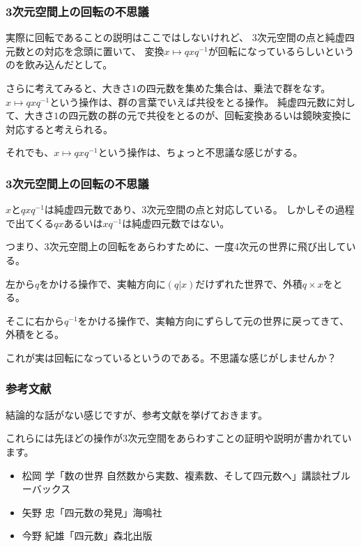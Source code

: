 \documentclass{beamer}
\begin{document}
\begin{frame}
    \frametitle{3次元空間上の回転の不思議}
    実際に回転であることの説明はここではしないけれど、
    3次元空間の点と純虚四元数との対応を念頭に置いて、
    変換\(x\mapsto qxq^{-1}\)が回転になっているらしいというのを飲み込んだとして。

    \bigskip
    さらに考えてみると、大きさ\(1\)の四元数を集めた集合は、乗法で群をなす。
    \(x\mapsto qxq^{-1}\)という操作は、群の言葉でいえば共役をとる操作。
    純虚四元数に対して、大きさ\(1\)の四元数の群の元で共役をとるのが、回転変換あるいは鏡映変換に対応すると考えられる。

    \bigskip
    それでも、\(x\mapsto qxq^{-1}\)という操作は、ちょっと不思議な感じがする。
\end{frame}

\begin{frame}
    \frametitle{3次元空間上の回転の不思議}
    \(x\)と\(qxq^{-1}\)は純虚四元数であり、3次元空間の点と対応している。
    しかしその過程で出てくる\(qx\)あるいは\(xq^{-1}\)は純虚四元数ではない。

    つまり、3次元空間上の回転をあらわすために、一度4次元の世界に飛び出している。

    \bigskip
    左から\(q\)をかける操作で、実軸方向に\((q|x)\)だけずれた世界で、外積\(q\times x\)をとる。

    そこに右から\(q^{-1}\)をかける操作で、実軸方向にずらして元の世界に戻ってきて、外積をとる。

    これが実は回転になっているというのである。不思議な感じがしませんか？
\end{frame}

\begin{frame}
    \frametitle{参考文献}
    結論的な話がない感じですが、参考文献を挙げておきます。

    \bigskip
    これらには先ほどの操作が3次元空間をあらわすことの証明や説明が書かれています。
    \begin{itemize}
        \item 松岡 学「数の世界 自然数から実数、複素数、そして四元数へ」講談社ブルーバックス
        \item 矢野 忠「四元数の発見」海鳴社
        \item 今野 紀雄「四元数」森北出版
    \end{itemize}
\end{frame}
\end{document}
